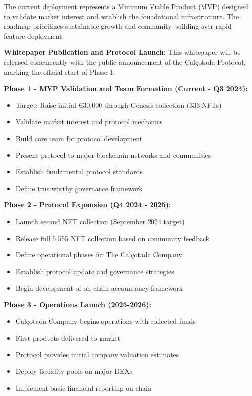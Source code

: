 \documentclass[conference]{IEEEtran}
\begin{document}
The current deployment represents a Minimum Viable Product (MVP) designed to validate market interest and establish the foundational infrastructure. The roadmap prioritizes sustainable growth and community building over rapid feature deployment.

\textbf{Whitepaper Publication and Protocol Launch:}
This whitepaper will be released concurrently with the public announcement of the Calçotada Protocol, marking the official start of Phase 1.

\textbf{Phase 1 - MVP Validation and Team Formation (Current - Q3 2024):}
\begin{itemize}
    \item Target: Raise initial €30,000 through Genesis collection (333 NFTs)
    \item Validate market interest and protocol mechanics
    \item Build core team for protocol development
    \item Present protocol to major blockchain networks and communities
    \item Establish fundamental protocol standards
    \item Define trustworthy governance framework
\end{itemize}

\textbf{Phase 2 - Protocol Expansion (Q4 2024 - 2025):}
\begin{itemize}
    \item Launch second NFT collection (September 2024 target)
    \item Release full 5,555 NFT collection based on community feedback
    \item Define operational phases for The Calçotada Company
    \item Establish protocol update and governance strategies
    \item Begin development of on-chain accountancy framework
\end{itemize}

\textbf{Phase 3 - Operations Launch (2025-2026):}
\begin{itemize}
    \item Calçotada Company begins operations with collected funds
    \item First products delivered to market
    \item Protocol provides initial company valuation estimates
    \item Deploy liquidity pools on major DEXs
    \item Implement basic financial reporting on-chain
\end{itemize}
\end{document}

